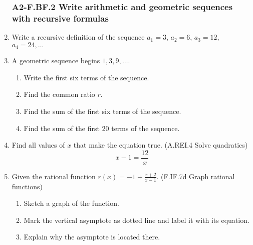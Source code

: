 \documentclass[12pt, twoside]{article}
\begin{document}
\begin{enumerate}
\subsubsection*{A2-F.BF.2 Write arithmetic and geometric sequences with recursive formulas}
\item Write a recursive definition of the sequence $a_1 = 3$, $a_2 = 6$, $a_3 = 12$, $a_4 = 24, \ldots$ \vspace{2cm}

\item A geometric sequence begins $1, 3, 9, \ldots$.
\begin{enumerate}[itemsep=0.5cm]
    \item Write the first six terms of the sequence.
    \item Find the common ratio $r$. 
    \item Find the sum of the first six terms of the sequence. \vspace{0.5cm}
    \item Find the sum of the first 20 terms of the sequence.
\end{enumerate}

\newpage
\item  Find all values of $x$ that make the equation true. \hfill (A.REI.4 Solve quadratics)
$$x-1=\frac{12}{x}$$ \vspace{4cm}

\item Given the rational function $\displaystyle r(x)=-1+\frac{x+2}{x-1}$. \hfill (F.IF.7d Graph rational functions)
    \begin{enumerate}[itemsep=0.25cm]
        \item Sketch a graph of the function.
        \item Mark the vertical asymptote as dotted line and label it with its equation.
        \item Explain why the asymptote is located there.
    \end{enumerate}
    \begin{center}
    \end{center}


\end{enumerate}
\end{document}
